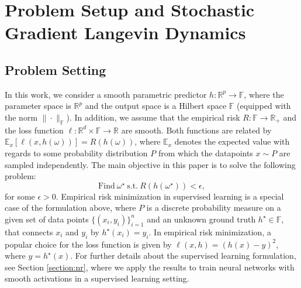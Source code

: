 \documentclass[10pt]{article} %
\newcommand{\R}{\mathbb{R}}
\newcommand{\bE}{\mathbb{E}}
\newcommand{\bF}{\mathbb{F}}
\newcommand{\bR}{\mathbb{R}}
\begin{document}
\section{Problem Setup and Stochastic Gradient Langevin Dynamics}
\subsection{Problem Setting}
In this work, we consider a smooth parametric predictor $h:\bR^p\rightarrow \bF$, where the parameter space is $\bR^p$ and the output space is a Hilbert space $\bF$ (equipped with the norm $\|\cdot \|_\bF$). In addition, we assume that the empirical risk $R:\bF\rightarrow \R_+$ and the loss function $\ell:\R^d\times\bF\rightarrow \R$ are smooth. Both functions are related by $\bE_x[\ell(x,h(\omega))]=R(h(\omega))$, where $\bE_x$ denotes the expected value with regards to some probability distribution $P$ from which the datapoints $x\sim P$ are sampled independently. The main objective in this paper is to solve the following problem:
$$\mathrm{Find} \ \omega^\star \ \mathrm{s.t.} \ R(h(\omega^\star))<\epsilon,$$
for some $\epsilon>0$. Empirical risk minimization in supervised learning is a special case of the formulation above, where $P$ is a discrete probability measure on a given set of data points $\{(x_i,y_i)\}_{i=1}^n$ and an unknown ground truth $h^\star\in\bF$, that connects $x_i$ and $y_i$ by $h^\star(x_i)=y_i$. In empirical risk minimization, a popular choice for the loss function is given by $\ell(x,h)=(h(x)-y)^2$, where $y=h^\star(x)$. For further details about the supervised learning formulation, see Section \ref{section:nr}, where we apply the results to train neural networks with smooth activations in a supervised learning setting.

\end{document}

